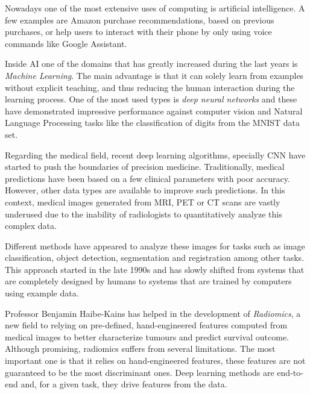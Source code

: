 

Nowadays one of the most extensive uses of computing is artificial intelligence. A few 
examples are Amazon purchase recommendations, based on previous purchases, or help users
to interact with their phone by only using voice commands like Google Assistant. 
~\cites{neural:amazon}{neural:google-assistant}

Inside AI one of the domains that has greatly increased during the last years is 
\emph{Machine Learning}. The main advantage is that it can solely learn from examples without 
explicit teaching, and thus reducing the human interaction during the learning process. One of the 
most used types is \emph{deep neural networks} and these have demonstrated impressive performance 
against computer vision and Natural Language Processing tasks like the classification of 
digits from the MNIST data set.
~\cites{neural:mnist}{neural:empirical-evaluation-deep-architectures}

Regarding the medical field, recent deep learning algorithms, specially \gls{CNN} 
have started to push the boundaries of precision medicine. 
Traditionally, medical predictions have been based on a few clinical parameters with poor accuracy.
However, other data types are available to improve such predictions. In this context, medical
images generated from \gls{MRI}, \gls{PET} or \gls{CT} scans are vastly underused 
due to the 
inability of radiologists to quantitatively analyze this complex data.

Different methods have appeared to analyze these images for tasks such as
image classification, object detection, segmentation and registration among other tasks. This
approach started in the late 1990s and has slowly shifted from systems that are completely designed
by humans to systems that are trained by computers using example data. 
~\cite{medical:survey-deep-learning}

Professor Benjamin Haibe-Kains has helped in the development of \emph{Radiomics}, a new field to
relying on pre-defined, hand-engineered features computed from medical images to better 
characterize tumours and predict survival outcome. Although promising, radiomics suffers from 
several limitations. The most important one is that it relies on hand-engineered features,
these features are not guaranteed to be the most discriminant ones. Deep learning methods
are end-to-end and, for a given task, they drive features from the data.
~\cite{medical:radiomics-ml-classifiers}

